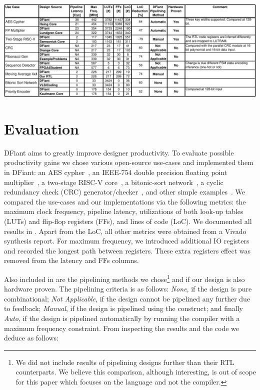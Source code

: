 
\begin{table}[t]
	\centering
	\captionsetup{justification=centering}
	\label{tbl:Results}
	\includegraphics[width=0.9\linewidth]{graphics/Results.pdf}
\end{table}

\section{Evaluation}
\label{sec:evaluation}
DFiant aims to greatly improve designer productivity. To evaluate possible productivity gains we chose various open-source use-cases and implemented them in DFiant: an AES cypher~\cite{hsing2013aes}, an IEEE-754 double precision floating point multiplier~\cite{lundgren2014open}, a two-stage RISC-V core~\cite{samsoniuk2019riscv}, a bitonic-sort network~\cite{bitsortvhdl}, a cyclic redundancy check (CRC) generator/checker~\cite{drange2016crc}, and other simple examples~\cite{pedroni2008digital, fibgenvhdl, seqdetvhdl}. We compared the use-cases and our implementations via the following metrics: the maximum clock frequency, pipeline latency, utilizations of both look-up tables (LUTs) and flip-flop registers (FFs), and lines of code (LoC). We documented all results in . Apart from the LoC, all other metrics were obtained from a Vivado synthesis report. For maximum frequency, we introduced additional IO registers and recorded the longest path between registers. These extra registers effect was removed from the latency and FFs columns.  

Also included in  are the pipelining methods we chose\footnote{We did not include results of pipelining designs further than their RTL counterparts. We believe this comparison, although interesting, is out of scope for this paper which focuses on the language and not the compiler.} and if our design is also hardware proven. The pipelining criteria is as follows: \emph{None}, if the design is pure combinational; \emph{Not Applicable}, if the design cannot be pipelined any further due to feedback; \emph{Manual}, if the design is pipelined using the  construct; and finally \emph{Auto}, if the design is pipelined automatically by running the compiler with a maximum frequency constraint. From inspecting the results and the code we deduce as follows:



